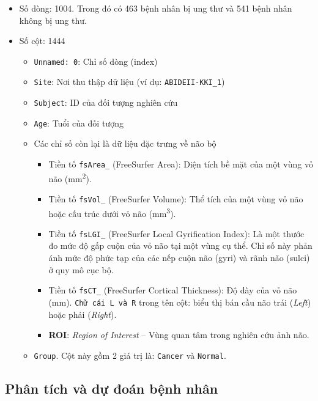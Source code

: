 \begin{itemize}
    \item Số dòng: 1004. Trong đó có 463 bệnh nhân bị ung thư và 541 bệnh
nhân không bị ung thư.
    \item  Số cột: 1444
    \begin{itemize}
    \item \texttt{Unnamed: 0}: Chỉ số dòng (index)
    \item \texttt{Site}: Nơi thu thập dữ liệu (ví dụ: \texttt{ABIDEII-KKI\_1})
    \item \texttt{Subject}: ID của đối tượng nghiên cứu
    \item \texttt{Age}: Tuổi của đối tượng
    \item Các chỉ số còn lại là dữ liệu đặc trưng về não bộ
    \begin{itemize}
        \item Tiền tố \texttt{\texttt{fsArea\_}} (FreeSurfer Area): Diện tích bề mặt của một vùng vỏ não (mm\textsuperscript{2}).
        \item Tiền tố \texttt{\texttt{fsVol\_}} (FreeSurfer Volume): Thể tích của một vùng vỏ não hoặc cấu trúc dưới vỏ não (mm\textsuperscript{3}). 
        \item Tiền tố \texttt{\texttt{fsLGI\_}} (FreeSurfer Local Gyrification Index): Là một thước đo mức độ gấp cuộn của vỏ não tại một vùng cụ thể. Chỉ số này phản ánh mức độ phức tạp của các nếp cuộn não (gyri) và rãnh não (sulci) ở quy mô cục bộ.
        \item Tiền tố \texttt{\texttt{fsCT\_}} (FreeSurfer Cortical Thickness): Độ dày của vỏ não (mm).
 \newline
 \texttt{Chữ cái \texttt{L} và \texttt{R}} trong tên cột: biểu thị bán cầu não trái (\textit{Left}) hoặc phải (\textit{Right}).

   \item \textbf{ROI}: \textit{Region of Interest} – Vùng quan tâm trong nghiên cứu ảnh não.
  
    \end{itemize}
\item \texttt{Group}. Cột này gồm  2 giá trị là: \texttt{Cancer} và \texttt{Normal}.
    \end{itemize}
\end{itemize}

\subsection{Phân tích và dự đoán bệnh nhân}

